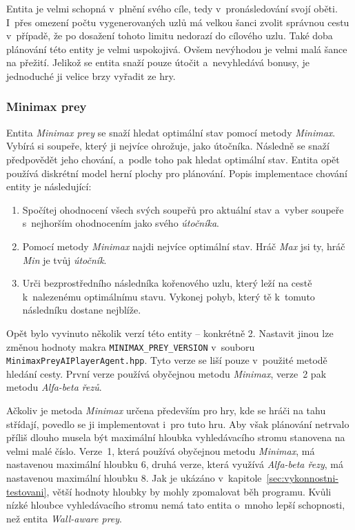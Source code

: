 Entita je velmi schopná v~plnění svého cíle, tedy v~pronásledování svojí oběti. I~přes omezení počtu vygenerovaných uzlů má velkou šanci zvolit správnou cestu v~případě, že po dosažení tohoto limitu nedorazí do cílového uzlu. Také doba plánování této entity je velmi uspokojivá. Ovšem nevýhodou je velmi malá šance na přežití. Jelikož se entita snaží pouze útočit a~nevyhledává bonusy, je jednoduché ji velice brzy vyřadit ze hry.

\subsubsection*{Minimax prey}

Entita \emph{Minimax prey} se snaží hledat optimální stav pomocí metody \emph{Minimax}. Vybírá si soupeře, který ji nejvíce ohrožuje, jako útočníka. Následně se snaží předpovědět jeho chování, a~podle toho pak hledat optimální stav. Entita opět používá diskrétní model herní plochy pro plánování. Popis implementace chování entity je následující:
\begin{enumerate}
    \item Spočítej ohodnocení všech svých soupeřů pro aktuální stav a~vyber soupeře s~nejhorším ohodnocením jako svého \emph{útočníka}.
    \item Pomocí metody \emph{Minimax} najdi nejvíce optimální stav. Hráč \emph{Max} jsi ty, hráč \emph{Min} je tvůj \emph{útočník}.
    \item Urči bezprostředního následníka kořenového uzlu, který leží na cestě k~nalezenému optimálnímu stavu. Vykonej pohyb, který tě k~tomuto následníku dostane nejblíže.
\end{enumerate}

Opět bylo vyvinuto několik verzí této entity -- konkrétně 2. Nastavit jinou lze změnou hodnoty makra \texttt{MINIMAX\_PREY\_VERSION} v~souboru \texttt{MinimaxPreyAIPlayerAgent.hpp}. Tyto verze se liší pouze v~použité metodě hledání cesty. První verze používá obyčejnou metodu \emph{Minimax}, verze~2 pak metodu \emph{Alfa-beta řezů}.

Ačkoliv je metoda \emph{Minimax} určena především pro hry, kde se hráči na tahu střídají, povedlo se ji implementovat i~pro tuto hru. Aby však plánování netrvalo příliš dlouho musela být maximální hloubka vyhledávacího stromu stanovena na velmi malé číslo. Verze~1, která používá obyčejnou metodu \emph{Minimax}, má nastavenou maximální hloubku 6, druhá verze, která využívá \emph{Alfa-beta řezy}, má nastavenou maximální hloubku 8. Jak je ukázáno v~kapitole~\ref{sec:vykonnostni-testovani}, větší hodnoty hloubky by mohly zpomalovat běh programu. Kvůli nízké hloubce vyhledávacího stromu nemá tato entita o~mnoho lepší schopnosti, než  entita \emph{Wall-aware prey}.

